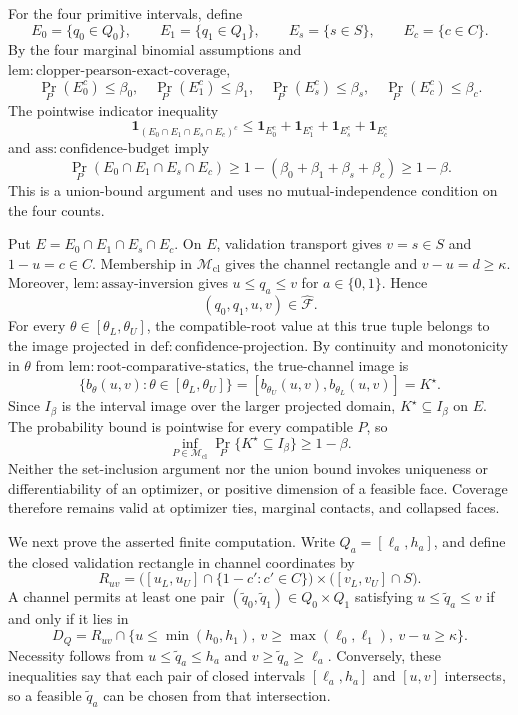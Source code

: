 For the four primitive intervals, define
\[
E_0=\{q_0\in Q_0\},\qquad
E_1=\{q_1\in Q_1\},\qquad
E_s=\{s\in S\},\qquad
E_c=\{c\in C\}.
\]
By the four marginal binomial assumptions and \(\mathrm{lem:clopper\text{-}pearson\text{-}exact\text{-}coverage}\),
\[
\Pr_P(E_0^c)\leq\beta_0,
\quad
\Pr_P(E_1^c)\leq\beta_1,
\quad
\Pr_P(E_s^c)\leq\beta_s,
\quad
\Pr_P(E_c^c)\leq\beta_c.
\]
The pointwise indicator inequality
\[
\mathbf 1_{(E_0\cap E_1\cap E_s\cap E_c)^c}
\leq
\mathbf 1_{E_0^c}+\mathbf 1_{E_1^c}
+\mathbf 1_{E_s^c}+\mathbf 1_{E_c^c}
\]
and \(\mathrm{ass:confidence\text{-}budget}\) imply
\[
\Pr_P(E_0\cap E_1\cap E_s\cap E_c)
\geq1-(\beta_0+\beta_1+\beta_s+\beta_c)
\geq1-\beta.
\]
This is a union-bound argument and uses no mutual-independence condition on the four counts.

Put \(E=E_0\cap E_1\cap E_s\cap E_c\). On \(E\), validation transport gives \(v=s\in S\) and \(1-u=c\in C\). Membership in \(\mathcal M_{\mathrm{cl}}\) gives the channel rectangle and \(v-u=d\geq\kappa\). Moreover, \(\mathrm{lem:assay\text{-}inversion}\) gives \(u\leq q_a\leq v\) for \(a\in\{0,1\}\). Hence
\[
(q_0,q_1,u,v)\in\widehat{\mathcal F}.
\]
For every \(\theta\in[\theta_L,\theta_U]\), the compatible-root value at this true tuple belongs to the image projected in \(\mathrm{def:confidence\text{-}projection}\). By continuity and monotonicity in \(\theta\) from \(\mathrm{lem:root\text{-}comparative\text{-}statics}\), the true-channel image is
\[
\{b_\theta(u,v):\theta\in[\theta_L,\theta_U]\}
=[b_{\theta_U}(u,v),b_{\theta_L}(u,v)]
=K^\star.
\]
Since \(I_\beta\) is the interval image over the larger projected domain, \(K^\star\subseteq I_\beta\) on \(E\). The probability bound is pointwise for every compatible \(P\), so
\[
\inf_{P\in\mathcal M_{\mathrm{cl}}}
\Pr_P\{K^\star\subseteq I_\beta\}\geq1-\beta.
\]
Neither the set-inclusion argument nor the union bound invokes uniqueness or differentiability of an optimizer, or positive dimension of a feasible face. Coverage therefore remains valid at optimizer ties, marginal contacts, and collapsed faces.

We next prove the asserted finite computation. Write \(Q_a=[\ell_a,h_a]\), and define the closed validation rectangle in channel coordinates by
\[
R_{uv}
=\bigl([u_L,u_U]\cap\{1-c':c'\in C\}\bigr)
\times\bigl([v_L,v_U]\cap S\bigr).
\]
A channel permits at least one pair \((\widetilde q_0,\widetilde q_1)\in Q_0\times Q_1\) satisfying \(u\leq\widetilde q_a\leq v\) if and only if it lies in
\[
D_Q=R_{uv}\cap
\{u\leq\min(h_0,h_1),\ v\geq\max(\ell_0,\ell_1),\ v-u\geq\kappa\}.
\]
Necessity follows from \(u\leq\widetilde q_a\leq h_a\) and \(v\geq\widetilde q_a\geq\ell_a\). Conversely, these inequalities say that each pair of closed intervals \([\ell_a,h_a]\) and \([u,v]\) intersects, so a feasible \(\widetilde q_a\) can be chosen from that intersection.

